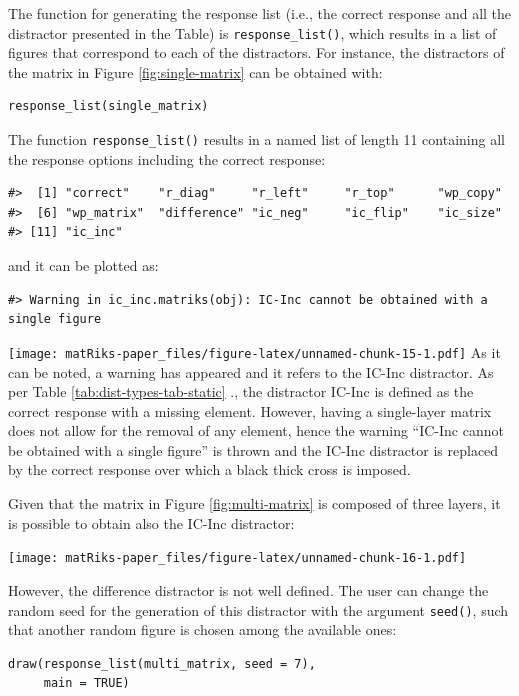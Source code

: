 The function for generating the response list (i.e., the correct response and all the distractor presented in the Table) is \texttt{response\_list()}, which results in a list of figures that correspond to each of the distractors.
For instance, the distractors of the matrix in Figure \ref{fig:single-matrix} can be obtained with:

\begin{verbatim}
response_list(single_matrix)
\end{verbatim}

The function \texttt{response\_list()} results in a named list of length 11 containing all the response options including the correct response:

\begin{verbatim}
#>  [1] "correct"    "r_diag"     "r_left"     "r_top"      "wp_copy"   
#>  [6] "wp_matrix"  "difference" "ic_neg"     "ic_flip"    "ic_size"   
#> [11] "ic_inc"
\end{verbatim}

and it can be plotted as:

\begin{verbatim}
#> Warning in ic_inc.matriks(obj): IC-Inc cannot be obtained with a single figure
\end{verbatim}

\texttt{[image: matRiks-paper\_files/figure-latex/unnamed-chunk-15-1.pdf]}
As it can be noted, a warning has appeared and it refers to the IC-Inc distractor. As per Table \ref{tab:dist-types-tab-static} ., the distractor IC-Inc is defined as the correct response with a missing element. However, having a single-layer matrix does not allow for the removal of any element, hence the warning ``IC-Inc cannot be obtained with a single figure'' is thrown and the IC-Inc distractor is replaced by the correct response over which a black thick cross is imposed.

Given that the matrix in Figure \ref{fig:multi-matrix} is composed of three layers, it is possible to obtain also the IC-Inc distractor:

\texttt{[image: matRiks-paper\_files/figure-latex/unnamed-chunk-16-1.pdf]}

However, the difference distractor is not well defined. The user can change the random seed for the generation of this distractor with the argument \texttt{seed()}, such that another random figure is chosen among the available ones:

\begin{verbatim}
draw(response_list(multi_matrix, seed = 7), 
     main = TRUE)
\end{verbatim}

